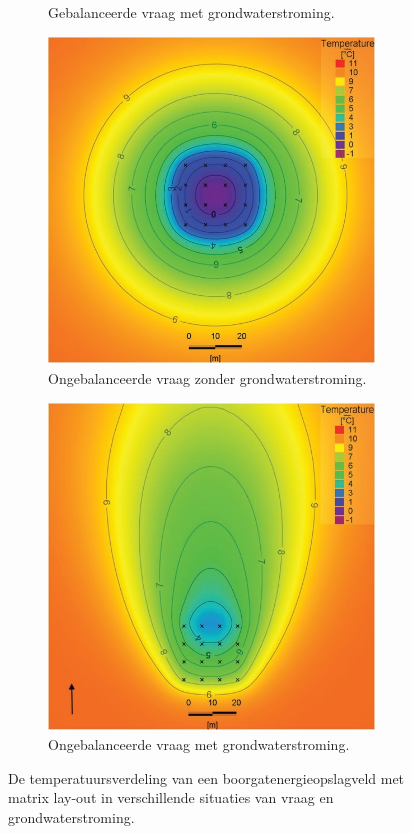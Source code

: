 \documentclass[a4paper,oneside,11pt]{report}
\numberwithin{figure}{section}
\numberwithin{table}{section}
\numberwithin{equation}{section}
\begin{document}
\begin{figure}[hbtp]
\begin{subfigure}{0.4\textwidth}
	\caption[width=0.95\textwidth]{Gebalanceerde vraag met grondwaterstroming.}
\end{subfigure}
\begin{subfigure}{0.4\textwidth}
	\centering
	\includegraphics[width=0.95\textwidth]{invlf_fig7c.jpg}
	\caption[width=0.95\textwidth]{Ongebalanceerde vraag zonder grondwaterstroming.}
\end{subfigure}%
\begin{subfigure}{0.4\textwidth}
	\centering
	\includegraphics[width=0.95\textwidth]{invlf_fig7d.jpg}
	\caption[width=0.95\textwidth]{Ongebalanceerde vraag met grondwaterstroming.}
\end{subfigure}%
\label{fig:invlf_7}
\centering
\caption{De temperatuursverdeling van een boorgatenergieopslagveld met matrix lay-out in verschillende situaties van vraag en grondwaterstroming.}
\end{figure}
\end{document}
